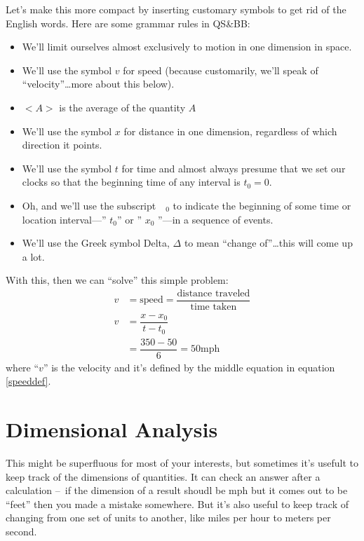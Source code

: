 \documentclass[
  letterpaper,
  DIV=11,
  numbers=noendperiod,
  oneside]{scrreprt}
\begin{document}
Let's make this more compact by inserting customary symbols to get rid
of the English words. Here are some grammar rules in QS\&BB:

\begin{itemize}
\item
  We'll limit ourselves almost exclusively to motion in one dimension in
  space.
\item
  We'll use the symbol \(v\) for speed (because customarily, we'll speak
  of ``velocity''\ldots more about this below).
\item
  \(<A>\) is the average of the quantity \(A\)
\item
  We'll use the symbol \(x\) for distance in one dimension, regardless
  of which direction it points.
\item
  We'll use the symbol \(t\) for time and almost always presume that we
  set our clocks so that the beginning time of any interval is
  \(t_0=0\).
\item
  Oh, and we'll use the subscript \(\text{ }_{0}\) to indicate the
  beginning of some time or location interval---'' \(t_0\)'' or ''
  \(x_0\) ''---in a sequence of events.
\item
  We'll use the Greek symbol Delta, \(\Delta\) to mean ``change
  of''\ldots this will come up a lot.
\end{itemize}

With this, then we can ``solve'' this simple problem: \[
\begin{align}
v &= \text{speed}=\dfrac{\text{distance traveled}}{\text{time taken}} \nonumber \\
v &=\dfrac{x-x_0}{t-t_0} \label{speeddef} \\
&= \dfrac{350-50}{6}=50  \text{mph} \nonumber
\end{align}
\] where ``\(v\)'' is the velocity and it's defined by the middle
equation in equation \ref{speeddef}.

\section{Dimensional Analysis}\label{dimensional-analysis}

This might be superfluous for most of your interests, but sometimes it's
usefult to keep track of the dimensions of quantities. It can check an
answer after a calculation --~if the dimension of a result shoudl be mph
but it comes out to be ``feet'' then you made a mistake somewhere. But
it's also useful to keep track of changing from one set of units to
another, like miles per hour to meters per second.
\end{document}
